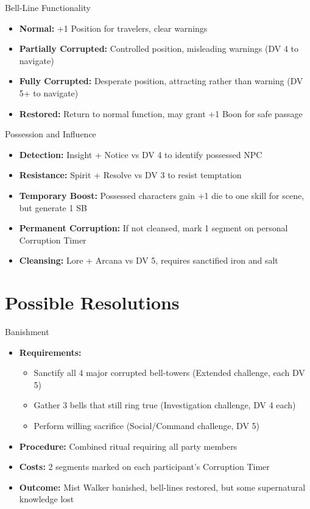 \documentclass[11pt]{article}
\begin{document}
\begin{mechanicsbox}{Bell-Line Functionality}
\begin{itemize}
    \item \textbf{Normal:} +1 Position for travelers, clear warnings
    \item \textbf{Partially Corrupted:} Controlled position, misleading warnings (DV 4 to navigate)
    \item \textbf{Fully Corrupted:} Desperate position, attracting rather than warning (DV 5+ to navigate)
    \item \textbf{Restored:} Return to normal function, may grant +1 Boon for safe passage
\end{itemize}
\end{mechanicsbox}

\begin{mechanicsbox}{Possession and Influence}
\begin{itemize}
    \item \textbf{Detection:} Insight + Notice vs DV 4 to identify possessed NPC
    \item \textbf{Resistance:} Spirit + Resolve vs DV 3 to resist temptation
    \item \textbf{Temporary Boost:} Possessed characters gain +1 die to one skill for scene, but generate 1 SB
    \item \textbf{Permanent Corruption:} If not cleansed, mark 1 segment on personal Corruption Timer 
    \item \textbf{Cleansing:} Lore + Arcana vs DV 5, requires sanctified iron and salt
\end{itemize}
\end{mechanicsbox}

\section*{Possible Resolutions}

\begin{mechanicsbox}{Banishment}
\begin{itemize}
    \item \textbf{Requirements:}
    \begin{itemize}
        \item Sanctify all 4 major corrupted bell-towers (Extended challenge, each DV 5)
        \item Gather 3 bells that still ring true (Investigation challenge, DV 4 each)
        \item Perform willing sacrifice (Social/Command challenge, DV 5)
    \end{itemize}
    \item \textbf{Procedure:} Combined ritual requiring all party members
    \item \textbf{Costs:} 2 segments marked on each participant's Corruption Timer 
    \item \textbf{Outcome:} Mist Walker banished, bell-lines restored, but some supernatural knowledge lost
\end{itemize}
\end{mechanicsbox}
\end{document}
